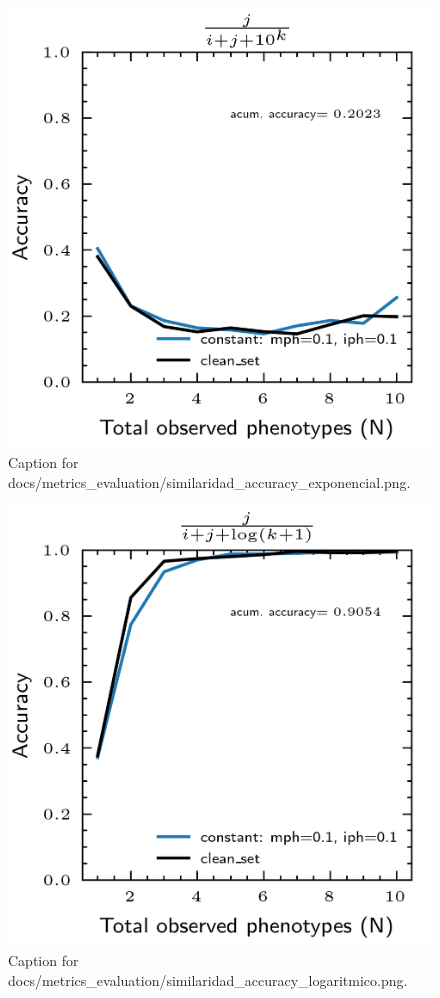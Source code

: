 \documentclass{article}
\begin{document}
\begin{figure}[h] \centering \includegraphics{docs/metrics_evaluation/similaridad_accuracy_exponencial.png} \caption{Caption for docs/metrics_evaluation/similaridad_accuracy_exponencial.png.} \end{figure}
\begin{figure}[h] \centering \includegraphics{docs/metrics_evaluation/similaridad_accuracy_logaritmico.png} \caption{Caption for docs/metrics_evaluation/similaridad_accuracy_logaritmico.png.} \end{figure}
\end{document}
